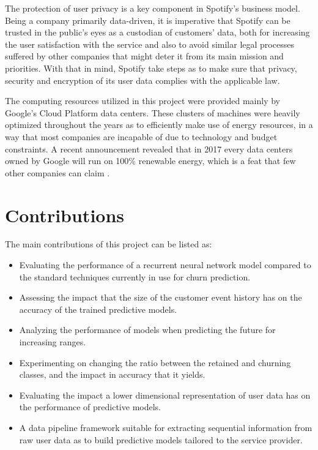 \documentclass{kththesis}
\begin{document}
The protection of user privacy is a key component in Spotify's business model. Being a company primarily data-driven, it is imperative that Spotify can be trusted in the public's eyes as a custodian of customers' data, both for increasing the user satisfaction with the service and also to avoid similar legal processes suffered by other companies that might deter it from its main mission and priorities. With that in mind, Spotify take steps as to make sure that privacy, security and encryption of its user data complies with the applicable law. 

The computing resources utilized in this project were provided mainly by Google's Cloud Platform data centers. These clusters of machines were heavily optimized throughout the years as to efficiently make use of energy resources, in a way that most companies are incapable of due to technology and budget constraints. A recent announcement revealed that in 2017 every data centers owned by Google will run on 100\% renewable energy, which is a feat that few other companies can claim \citep{google2017renew}.  

\section{Contributions}

The main contributions of this project can be listed as:

\begin{itemize}
\item Evaluating the performance of a recurrent neural network model compared to the standard techniques currently in use for churn prediction.
\item Assessing the impact that the size of the customer event history has on the accuracy of the trained predictive models.
\item Analyzing the performance of models when predicting the future for increasing ranges.
\item Experimenting on changing the ratio between the retained and churning classes, and the impact in accuracy that it yields.
\item Evaluating the impact a lower dimensional representation of user data has on the performance of predictive models.
\item A data pipeline framework suitable for extracting sequential information from raw user data as to build predictive models tailored to the service provider.
\end{itemize}
\end{document}
